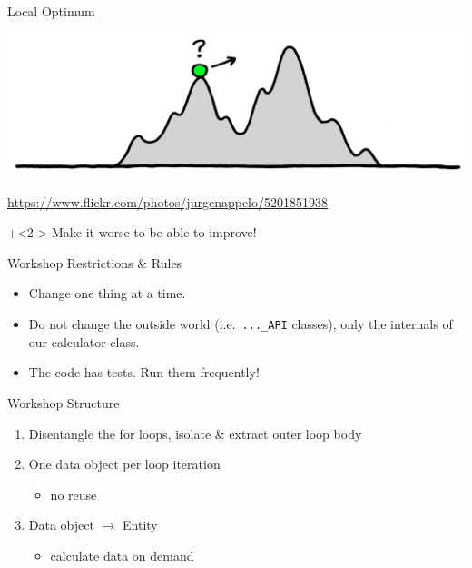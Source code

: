 \begin{frame}[fragile]{Local Optimum}

{
\begin{center}
\includegraphics[width=\textwidth]{LocalOptimum.jpg}
\end{center}
\vspace{-1.7em}
\hfill \tiny{\url{https://www.flickr.com/photos/jurgenappelo/5201851938}}
}

\onslide+<2->
\vspace{2em}
Make it worse to be able to improve!

\end{frame}


\begin{frame}[fragile]{Workshop Restrictions \& Rules}

\begin{itemize}
\item Change one thing at a time.
\item Do not change the outside world (i.e.~\texttt{...\_API} classes), only the internals of our calculator class.
\item The code has tests. Run them frequently!
\end{itemize}

\end{frame}




\begin{frame}[fragile]{Workshop Structure}


\begin{enumerate}
\item Disentangle the for loops, isolate \& extract outer loop body
\item One data object per loop iteration
\begin{itemize}
\item no reuse
\end{itemize}
\item Data object $\rightarrow$ Entity
\begin{itemize}
\item calculate data on demand
\end{itemize}
\end{enumerate}

\end{frame}




